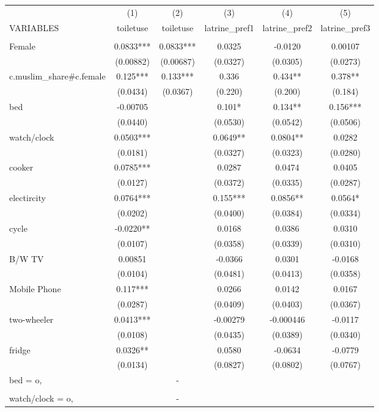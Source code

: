 \begin{tabular}{lccccc} \hline
 & (1) & (2) & (3) & (4) & (5) \\
VARIABLES & toiletuse & toiletuse & latrine\_pref1 & latrine\_pref2 & latrine\_pref3 \\ \hline
 &  &  &  &  &  \\
Female & 0.0833*** & 0.0833*** & 0.0325 & -0.0120 & 0.00107 \\
 & (0.00882) & (0.00687) & (0.0327) & (0.0305) & (0.0273) \\
c.muslim\_share\#c.female & 0.125*** & 0.133*** & 0.336 & 0.434** & 0.378** \\
 & (0.0434) & (0.0367) & (0.220) & (0.200) & (0.184) \\
bed & -0.00705 &  & 0.101* & 0.134** & 0.156*** \\
 & (0.0440) &  & (0.0530) & (0.0542) & (0.0506) \\
watch/clock & 0.0503*** &  & 0.0649** & 0.0804** & 0.0282 \\
 & (0.0181) &  & (0.0327) & (0.0323) & (0.0280) \\
cooker & 0.0785*** &  & 0.0287 & 0.0474 & 0.0405 \\
 & (0.0127) &  & (0.0372) & (0.0335) & (0.0287) \\
electircity & 0.0764*** &  & 0.155*** & 0.0856** & 0.0564* \\
 & (0.0202) &  & (0.0400) & (0.0384) & (0.0334) \\
cycle & -0.0220** &  & 0.0168 & 0.0386 & 0.0310 \\
 & (0.0107) &  & (0.0358) & (0.0339) & (0.0310) \\
B/W TV & 0.00851 &  & -0.0366 & 0.0301 & -0.0168 \\
 & (0.0104) &  & (0.0481) & (0.0413) & (0.0358) \\
Mobile Phone & 0.117*** &  & 0.0266 & 0.0142 & 0.0167 \\
 & (0.0287) &  & (0.0409) & (0.0403) & (0.0367) \\
two-wheeler & 0.0413*** &  & -0.00279 & -0.000446 & -0.0117 \\
 & (0.0108) &  & (0.0435) & (0.0389) & (0.0340) \\
fridge & 0.0326** &  & 0.0580 & -0.0634 & -0.0779 \\
 & (0.0134) &  & (0.0827) & (0.0802) & (0.0767) \\
bed = o, &  & - &  &  &  \\
 &  &  &  &  &  \\
watch/clock = o, &  & - &  &  &  \\

\end{tabular}

